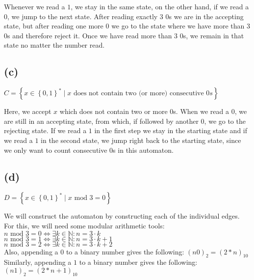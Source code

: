 Whenever we read a $1$, we stay in the same state, on the other hand, if we read a $0$, we jump to the next state. After reading exactly 3 $0$s we are in the accepting state, but after reading one more $0$ we go to the state where we have more than 3 $0$s and therefore reject it. Once we have read more than 3 $0$s, we remain in that state no matter the number read.

\subsection{(c)}

$C = \left\{ x \in \left\{0,1\right\} ^{*} \mid x \text{ does not contain two (or more) consecutive } 0s \right\}$


Here, we accept $x$ which does not contain two or more $0$s. When we read a $0$, we are still in an accepting state, from which, if followed by another $0$, we go to the rejecting state. If we read a $1$ in the first step we stay in the starting state and if we read a $1$ in the second state, we jump right back to the starting state, since we only want to count consecutive $0$s in this automaton.

\subsection{(d)}

$D = \left\{ x \in \left\{0,1\right\} ^{*} \mid x \text{ mod } 3 = 0 \right\}$

We will construct the automaton by constructing each of the individual edges.\\
For this, we will need some modular arithmetic tools:\\
$n\text{ mod } 3 = 0 \Leftrightarrow \exists k \in \mathbb{N}: n = 3\cdot k$\\
$n\text{ mod } 3 = 1 \Leftrightarrow \exists k \in \mathbb{N}: n = 3\cdot k + 1$\\
$n\text{ mod } 3 = 2 \Leftrightarrow \exists k \in \mathbb{N}: n = 3\cdot k + 2$\\
Also, appending a $0$ to a binary number gives the following: $(n0)_{2} = (2*n)_{10}$\\
Similarly, appending a $1$ to a binary number gives the following: $(n1)_{2} = (2*n+1)_{10}$\\

